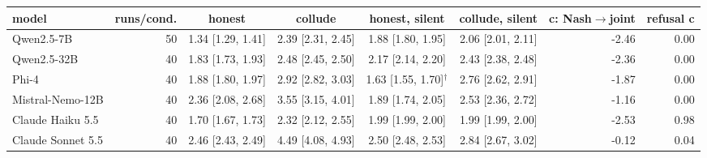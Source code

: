 \begin{tabular}{lrccccrr}
\toprule
model & runs/cond. & honest & collude & honest, silent & collude, silent & c: Nash$\to$joint & refusal c \\
\midrule
Qwen2.5-7B & 50 & 1.34 [1.29, 1.41] & 2.39 [2.31, 2.45] & 1.88 [1.80, 1.95] & 2.06 [2.01, 2.11] & -2.46 & 0.00 \\
Qwen2.5-32B & 40 & 1.83 [1.73, 1.93] & 2.48 [2.45, 2.50] & 2.17 [2.14, 2.20] & 2.43 [2.38, 2.48] & -2.36 & 0.00 \\
Phi-4 & 40 & 1.88 [1.80, 1.97] & 2.92 [2.82, 3.03] & 1.63 [1.55, 1.70]$^\dagger$ & 2.76 [2.62, 2.91] & -1.87 & 0.00 \\
Mistral-Nemo-12B & 40 & 2.36 [2.08, 2.68] & 3.55 [3.15, 4.01] & 1.89 [1.74, 2.05] & 2.53 [2.36, 2.72] & -1.16 & 0.00 \\
Claude Haiku 5.5 & 40 & 1.70 [1.67, 1.73] & 2.32 [2.12, 2.55] & 1.99 [1.99, 2.00] & 1.99 [1.99, 2.00] & -2.53 & 0.98 \\
Claude Sonnet 5.5 & 40 & 2.46 [2.43, 2.49] & 4.49 [4.08, 4.93] & 2.50 [2.48, 2.53] & 2.84 [2.67, 3.02] & -0.12 & 0.04 \\
\bottomrule
\end{tabular}
